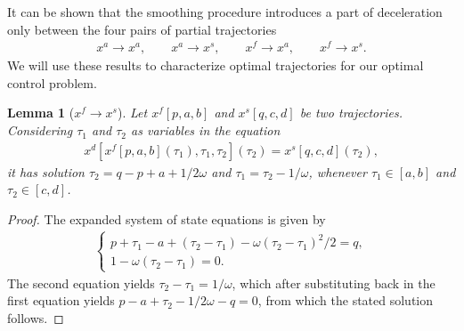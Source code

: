 \documentclass[a4paper]{article}
\theoremstyle{definition}
\theoremstyle{plain}
\newtheorem{lemma}{Lemma\hspace{0.25em}\ignorespaces}
\begin{document}
It can be shown that the smoothing procedure introduces a part of deceleration
only between the four pairs of partial trajectories
\begin{align*}
    x^{a} \rightarrow x^{a} , \quad \quad
    x^{a} \rightarrow x^{s} , \quad \quad
    x^{f} \rightarrow x^{a} , \quad \quad
    x^{f} \rightarrow x^{s} .
\end{align*}
We will use these results to characterize optimal trajectories for our optimal
control problem.

\begin{lemma}[$x^{f} \rightarrow x^{s}$]
  Let $x^{f}[p, a, b]$ and $x^{s}[q, c, d]$ be two trajectories. Considering
  $\tau_{1}$ and $\tau_{2}$ as variables in the equation
  \begin{align*}
    x^{d}[x^{f}[p, a, b](\tau_{1}), \tau_{1}, \tau_{2}](\tau_{2}) = x^{s}[q, c, d](\tau_{2}) ,
  \end{align*}
  it has solution
  $\tau_{2} = q - p + a + 1/2\omega$ and $\tau_{1} = \tau_{2} - 1/\omega$, whenever
  $\tau_{1} \in [a, b]$ and $\tau_{2} \in [c, d]$.
\end{lemma}
\begin{proof}
  The expanded system of state equations is given by
  \begin{align*}
    \begin{cases}
      p + \tau_{1} - a + (\tau_{2} - \tau_{1}) - \omega(\tau_{2} - \tau_{1})^{2} / 2 = q , \\
      1 - \omega(\tau_{2} - \tau_{1}) = 0 .
    \end{cases}
  \end{align*}
  The second equation yields $\tau_{2} - \tau_{1} = 1/\omega$, which after
  substituting back in the first equation yields
  $p - a + \tau_{2} - 1/2\omega - q = 0$, from which the stated solution
  follows.
\end{proof}
\end{document}
